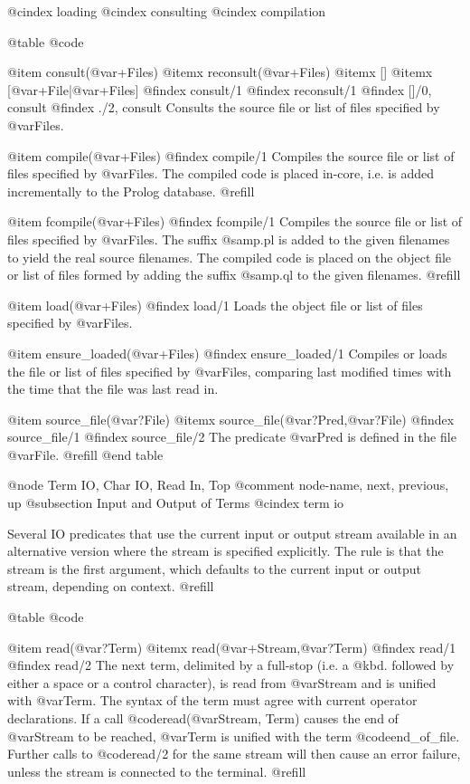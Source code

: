 @cindex loading
@cindex consulting
@cindex compilation

@table @code

@item consult(@var{+Files})
@itemx reconsult(@var{+Files})
@itemx []
@itemx [@var{+File}|@var{+Files}]
@findex consult/1
@findex reconsult/1
@findex []/0, consult
@findex ./2, consult
Consults the source file or list of files specified by @var{Files}.

@item compile(@var{+Files})
@findex compile/1
Compiles the source file or list of files specified by @var{Files}.
The compiled code is placed in-core, i.e. is added incrementally to the Prolog
database. @refill

@item fcompile(@var{+Files})
@findex fcompile/1
Compiles the source file or list of files specified by @var{Files}.  The
suffix @samp{.pl} is added to the given filenames to yield the real source
filenames.  The compiled code is placed on the object file or list of
files formed by adding the suffix @samp{.ql} to the given filenames. @refill

@item load(@var{+Files})
@findex load/1
Loads the object file or list of files specified by @var{Files}.

@item ensure_loaded(@var{+Files})
@findex ensure_loaded/1
Compiles or loads the file or list of files specified by @var{Files},
comparing last modified times with the time that the file was last read in.

@item source_file(@var{?File})
@itemx source_file(@var{?Pred},@var{?File})
@findex source_file/1
@findex source_file/2
The predicate @var{Pred} is defined in the file @var{File}. @refill
@end table

@node Term IO, Char IO, Read In, Top
@comment  node-name,  next,  previous,  up
@subsection Input and Output of Terms
@cindex term io

Several IO predicates that use the current input or output stream
available in an alternative version where the stream is specified
explicitly.  The rule is that the stream is the first argument, which
defaults to the current input or output stream, depending on context.
@refill

@table @code

@item read(@var{?Term})
@itemx read(@var{+Stream},@var{?Term})
@findex read/1
@findex read/2
The next term, delimited by a full-stop (i.e. a @kbd{.} followed by
either a space or a control character), is read from @var{Stream} and is
unified with @var{Term}.  The syntax of the term must agree with current
operator declarations.  If a call @code{read(@var{Stream, Term})} causes
the end of @var{Stream} to be reached, @var{Term} is unified with the
term @code{end_of_file}.  Further calls to @code{read/2} for the same
stream will then cause an error failure, unless the stream is connected
to the terminal. @refill

